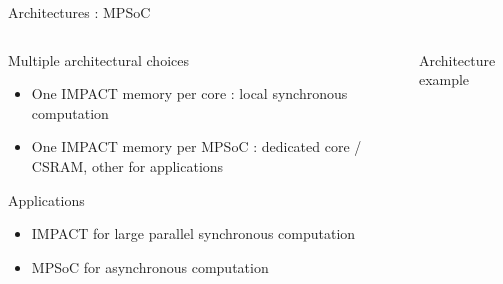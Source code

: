 \begin{Frame}{Architectures : MPSoC}
  \begin{columns}[t]
    \begin{column}{\BW}
      \begin{block}{Multiple architectural choices}
        \begin{itemize}
        \item One IMPACT memory per core : local synchronous computation
        \item One IMPACT memory per MPSoC : dedicated core / CSRAM,
          other for applications
        \end{itemize}
      \end{block}

      \begin{block}{Applications}
        \begin{itemize}
        \item IMPACT for large parallel synchronous computation
        \item MPSoC for asynchronous computation
        \end{itemize}
      \end{block}

    \end{column}
    \begin{column}{\BW}
      \begin{block}{Architecture example}
      \end{block}
    \end{column}

  \end{columns}

\end{Frame}
